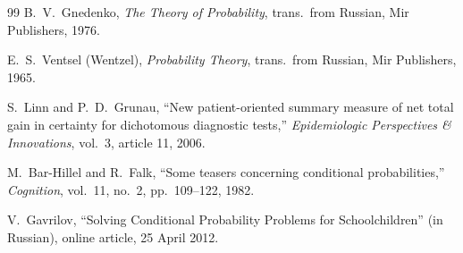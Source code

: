 \documentclass[11pt]{article}
\begin{document}
\begin{thebibliography}{99}
B.\ V.\ Gnedenko,
\emph{The Theory of Probability},
trans.\ from Russian, Mir Publishers, 1976.

E.\ S.\ Ventsel (Wentzel),
\emph{Probability Theory},
trans.\ from Russian, Mir Publishers, 1965.

S.\ Linn and P.\ D.\ Grunau,
``New patient-oriented summary measure of net total gain in certainty for dichotomous diagnostic tests,''
\emph{Epidemiologic Perspectives \& Innovations}, vol.\ 3, article 11, 2006.

M.\ Bar-Hillel and R.\ Falk,
``Some teasers concerning conditional probabilities,''
\emph{Cognition}, vol.\ 11, no.\ 2, pp.\ 109--122, 1982.

V.\ Gavrilov,
``Solving Conditional Probability Problems for Schoolchildren'' (in Russian),
online article, 25 April 2012.

\end{thebibliography}
\end{document}
